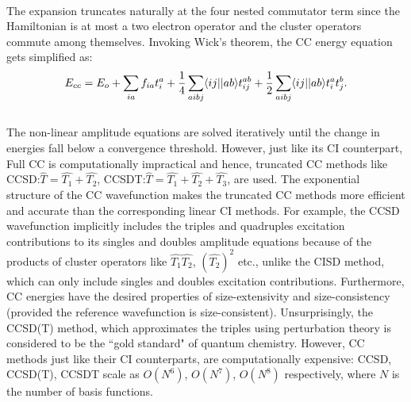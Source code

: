 \\
The expansion truncates naturally at the four nested commutator term since the Hamiltonian is at most a two 
electron operator and the cluster operators commute among themselves\cite{Crawford00}.
Invoking Wick's theorem\cite{Wick50}, the CC energy equation gets simplified as:
\\
\begin{equation}
E_{cc} = E_o + \sum_{ia}f_{ia}t^a_i + \frac{1}{4}\sum_{aibj}\langle ij || ab \rangle t^{ab}_{ij} + \frac{1}{2}\sum_{aibj}\langle ij || ab \rangle t^a_it^b_j.
\end{equation} 
\\
The non-linear amplitude equations are solved iteratively until the change in energies
fall below a convergence threshold. However, just like its CI counterpart, Full CC is 
computationally impractical and hence, truncated CC methods like CCSD:\;$\hat{T} =
\hat{T_1} + \hat{T_2}$, CCSDT:\;$\hat{T} = \hat{T_1} + \hat{T_2} + \hat{T_3}$, 
are used. The exponential structure of the CC wavefunction makes the truncated CC methods 
more efficient and accurate than the corresponding linear CI methods. For example,
the CCSD wavefunction implicitly includes the triples and quadruples excitation contributions to 
its singles and doubles amplitude equations because of the products of cluster operators like 
$\hat{T_1}\hat{T_2}$, ${(\hat{T_2})}^2$ etc., unlike the CISD method, which can only include 
singles and doubles excitation contributions. Furthermore, CC energies have the desired 
properties of size-extensivity and size-consistency (provided the reference wavefunction is
size-consistent). Unsurprisingly, the CCSD(T)\cite{Shen12} method, which approximates the triples using
perturbation theory is considered to be the ``gold standard" of quantum chemistry.
However, CC methods just like their CI counterparts, are computationally expensive: 
CCSD, CCSD(T), CCSDT scale as $O(N^6)$, $O(N^7)$, $O(N^8)$ respectively, where $N$ 
is the number of basis functions.\\
